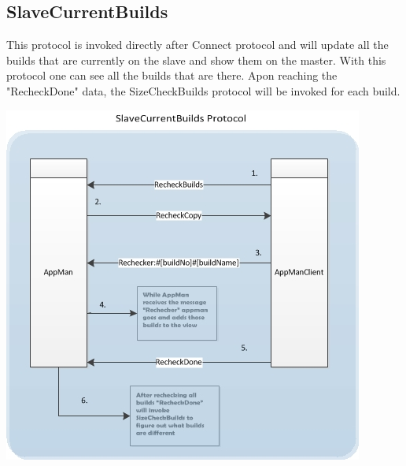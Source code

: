 \documentclass[a4paper,12pt,final]{article}
\begin{document}
\subsection{SlaveCurrentBuilds}
This protocol is invoked directly after Connect protocol and will update all the builds that are currently on the slave and show them on the master. With this protocol one can see all the builds that are there. Apon reaching the "RecheckDone" data, the SizeCheckBuilds protocol will be invoked for each build.
\begin{center}
\includegraphics[scale=1.0]{CommunicationProtocol/SlaveCurrentBuildsProtocol.jpg} 
\end{center}
\end{document}
